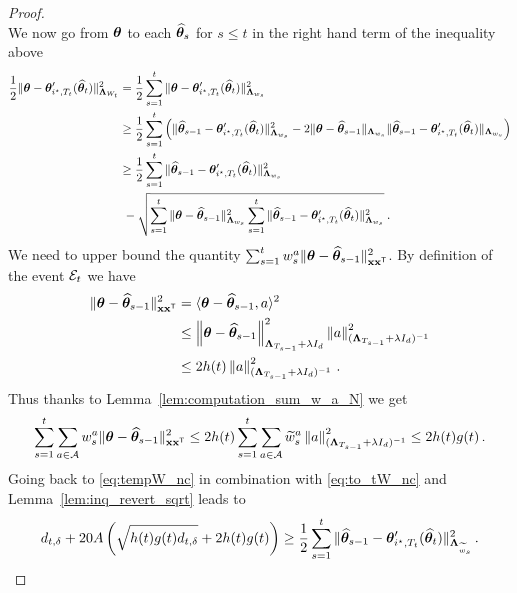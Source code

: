 \begin{proof}
\begin{equation}
\end{equation}
We now go from ${\boldsymbol \theta}$ to each $\widehat{{\boldsymbol \theta}}_s$ for $s \le t$ in the right hand term of the inequality above
\begin{align}
\frac{1}{2}\Vert {\boldsymbol \theta} - {\boldsymbol \theta}'_{i^\star,T_t}(\widehat{{\boldsymbol \theta}}_t) \Vert_{{\boldsymbol \Lambda}_{W_t}}^2
&=   \frac{1}{2} \sum_{s=1}^t  \Vert {\boldsymbol \theta} - {\boldsymbol \theta}'_{i^\star,T_t}(\widehat{{\boldsymbol \theta}}_t) \Vert_{{\boldsymbol \Lambda}_{w_s}}^2
\nonumber\\
&\ge \frac{1}{2} \sum_{s=1}^t \left(\Vert \widehat{{\boldsymbol \theta}}_{s-1} - {\boldsymbol \theta}'_{i^\star,T_t}(\widehat{{\boldsymbol \theta}}_t)\Vert_{{\boldsymbol \Lambda}_{w_s}}^2 - 2\Vert {\boldsymbol \theta} - \widehat{{\boldsymbol \theta}}_{s-1} \Vert_{{\boldsymbol \Lambda}_{w_s}} \Vert \widehat{{\boldsymbol \theta}}_{s-1} - {\boldsymbol \theta}'_{i^\star,T_t}(\widehat{{\boldsymbol \theta}}_t) \Vert_{{\boldsymbol \Lambda}_{w_s}}\right)
\nonumber\\
&\ge \frac{1}{2} \sum_{s=1}^t \Vert \widehat{{\boldsymbol \theta}}_{s-1} - {\boldsymbol \theta}'_{i^\star,T_t}(\widehat{{\boldsymbol \theta}}_t) \Vert_{{\boldsymbol \Lambda}_{w_s}}^2
\nonumber\\
&\ - \sqrt{\sum_{s=1}^t \Vert {\boldsymbol \theta} - \widehat{{\boldsymbol \theta}}_{s-1} \Vert_{{\boldsymbol \Lambda}_{w_s}}^2 \sum_{s=1}^t\Vert \widehat{{\boldsymbol \theta}}_{s-1} -{\boldsymbol \theta}'_{i^\star,T_t}(\widehat{{\boldsymbol \theta}}_t) \Vert_{{\boldsymbol \Lambda}_{w_s}}^2}
\: .\label{eq:tempW_nc}
\end{align}
We need to upper bound the quantity $\sum_{s=1}^t  w_s^{a}\Vert {\boldsymbol \theta} - \widehat{{\boldsymbol \theta}}_{s-1} \Vert_{{\bf x}{\bf x}^\mathsf{\scriptscriptstyle T}}^2$. By definition of the event $\mathcal{E}_t$ we have
\begin{align*}
  \Vert {\boldsymbol \theta} - \widehat{{\boldsymbol \theta}}_{s-1} \Vert_{{\bf x}{\bf x}^\mathsf{\scriptscriptstyle T}}^2 &=  \langle {\boldsymbol \theta} - \widehat{{\boldsymbol \theta}}_{s-1} ,a\rangle^2\\
  &\leq\left\lVert {\boldsymbol \theta} - \widehat{{\boldsymbol \theta}}_{s-1}\right\rVert_{{\boldsymbol \Lambda}_{T_{s-1}}+\lambda I_d}^2 \left\lVert a\right\rVert_{({\boldsymbol \Lambda}_{T_{s-1}}+\lambda I_d)^{-1}}^2\\
  &\leq 2 h(t) \left\lVert a \right\rVert_{({\boldsymbol \Lambda}_{T_{s-1}}+\lambda I_d)^{-1}}^2\,.
\end{align*}
Thus thanks to Lemma~\ref{lem:computation_sum_w_a_N} we get
\begin{align*}
  \sum_{s=1}^t \sum_{a\in\mathcal{A}} w_s^{a}\Vert {\boldsymbol \theta} - \widehat{{\boldsymbol \theta}}_{s-1} \Vert_{{\bf x}{\bf x}^\mathsf{\scriptscriptstyle T}}^2 \leq 2h(t)\sum_{s=1}^t \sum_{a\in\mathcal{A}} \widetilde{w}_s^{a} \left\lVert a \right\rVert_{({\boldsymbol \Lambda}_{T_{s-1}}+\lambda I_d)^{-1}}^2 \leq 2h(t)g(t)\,.
\end{align*}
Going back to \eqref{eq:tempW_nc} in combination with \eqref{eq:to_tW_nc} and Lemma~\ref{lem:inq_revert_sqrt} leads to
\begin{align}
\label{eq:to_hteta_nc}
d_{t,\delta} + 20 A\left(\sqrt{h(t)g(t) d_{t,\delta}}+ 2h(t)g(t)\right)   \geq
\frac{1}{2}\sum_{s=1}^t \Vert \widehat{{\boldsymbol \theta}}_{s-1} - {\boldsymbol \theta}'_{i^\star,T_t}(\widehat{{\boldsymbol \theta}}_t)\Vert_{{\boldsymbol \Lambda}_{\widetilde{w}_s}}^2\,.
\end{align}
\end{proof}



